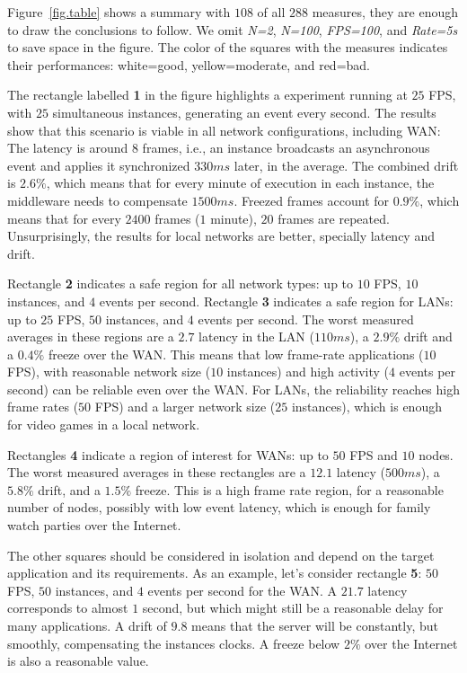 \documentclass[sigplan,screen]{acmart}
\begin{document}
Figure~\ref{fig.table} shows a summary with $108$ of all $288$ measures, they
are enough to draw the conclusions to follow.
We omit \emph{N=2}, \emph{N=100}, \emph{FPS=100}, and \emph{Rate=5s} to save
space in the figure.
The color of the squares with the measures indicates their performances:
    white=good, yellow=moderate, and red=bad.

The rectangle labelled \textbf{1} in the figure highlights a experiment
running at $25$ FPS, with $25$ simultaneous instances, generating an event
every second.
%
The results show that this scenario is viable in all network configurations,
including WAN:
%
The latency is around $8$ frames, i.e., an instance broadcasts an asynchronous
event and applies it synchronized $330ms$ later, in the average.
The combined drift is $2.6\%$, which means that for every minute of execution
in each instance, the middleware needs to compensate $1500ms$.
Freezed frames account for $0.9\%$, which means that for every $2400$ frames
($1$ minute), $20$ frames are repeated.
%
Unsurprisingly, the results for local networks are better, specially latency
and drift.

Rectangle \textbf{2} indicates a safe region for all network types: up to $10$
FPS, $10$ instances, and $4$ events per second.
%
Rectangle \textbf{3} indicates a safe region for LANs: up to $25$ FPS, $50$
instances, and $4$ events per second.
%
The worst measured averages in these regions are
    a $2.7$ latency in the LAN ($110ms$),
    a $2.9\%$ drift and
    a $0.4\%$ freeze over the WAN.
%
This means that low frame-rate applications ($10$ FPS), with reasonable network
size ($10$ instances) and high activity ($4$ events per second) can be reliable
even over the WAN.
For LANs, the reliability reaches high frame rates ($50$ FPS) and a larger
network size ($25$ instances), which is enough for video games in a local
network.

Rectangles \textbf{4} indicate a region of interest for WANs: up to $50$ FPS
and $10$ nodes.
The worst measured averages in these rectangles are
    a $12.1$ latency ($500ms$),
    a $5.8\%$ drift, and
    a $1.5\%$ freeze.
This is a high frame rate region, for a reasonable number of nodes, possibly
with low event latency, which is enough for family watch parties over the
Internet.

The other squares should be considered in isolation and depend on the target
application and its requirements.
%
As an example, let's consider rectangle \textbf{5}: $50$ FPS, $50$ instances,
and $4$ events per second for the WAN.
A $21.7$ latency corresponds to almost $1$ second, but which might still be a
reasonable delay for many applications.
A drift of $9.8$ means that the server will be constantly, but smoothly,
compensating the instances clocks.
A freeze below $2\%$ over the Internet is also a reasonable value.
\end{document}
